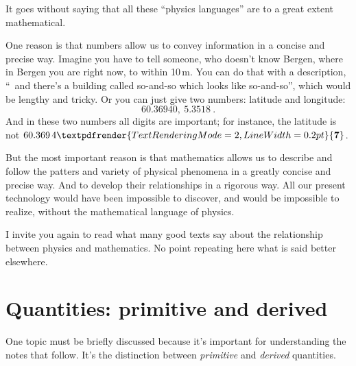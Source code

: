 \documentclass[a4paper,12pt,%
onecolumn,oneside,%
british%
]{memoir}
\renewcommand*{\bm}[1]{\textpdfrender{TextRenderingMode=2,LineWidth=0.2pt}{\boldsymbol{#1}}}
\renewcommand*{\|}[1][]{\nonscript\:#1\vert\nonscript\:\mathopen{}}
\begin{document}
\medskip

It goes without saying that all these \enquote{physics languages} are to a great extent mathematical.

One reason is that numbers allow us to convey information in a concise and precise way. Imagine you have to tell someone, who doesn't know
Bergen, where in Bergen you are right now, to within 10\,m. You can do that with a description, \enquote{\textellipsis\ and there's a building called so-and-so which looks like so-and-so\textellipsis}, which would be lengthy and tricky. Or you can just give two numbers: latitude and longitude:
\begin{equation*}
  \num{60.36940},\ \num{5.3518} \ .
\end{equation*}
And in these two numbers all digits are important; for instance, the latitude is not \ensuremath{60.369\,4\bm{7}}.

But the most important reason is that mathematics allows us to describe and follow the patters and variety of physical phenomena in a greatly concise and precise way. And to develop their relationships in a rigorous way.
All our present technology would have been impossible to discover, and would be impossible to realize, without the mathematical language of physics.

I invite you again to read what many good texts say about the relationship between physics and mathematics. No point repeating here what is said better elsewhere.

\section{Quantities: primitive and derived}
\label{sec:primitives}

One topic must be briefly discussed because it's important for understanding the notes that follow. It's the distinction between \emph{primitive} and \emph{derived} quantities.
\end{document}

